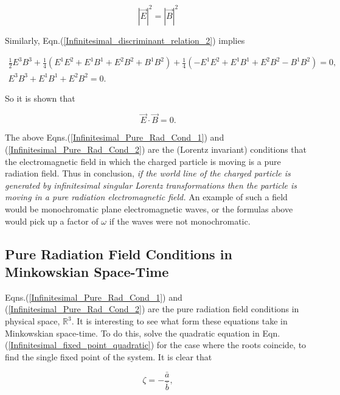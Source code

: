 \begin{equation}\label{Infinitesimal_Pure_Rad_Cond_1}
{|\vec{E}|}^2 = {|\vec{B}|}^2
\end{equation}

\noindent Similarly, Eqn.(\ref{Infinitesimal_discriminant_relation_2}) implies

\begin{gather*}
\frac{1}{2} E^3 B^3 + \frac{1}{4} (E^1E^2 + E^1B^1 + E^2B^2 + B^1B^2) + \frac{1}{4} (-E^1E^2 + E^1B^1 + E^2B^2 - B^1B^2) = 0, \\
E^3B^3 + E^1B^1 + E^2B^2 = 0.
\end{gather*}

\noindent So it is shown that

\begin{equation}\label{Infinitesimal_Pure_Rad_Cond_2}
\vec{E} \cdot \vec{B} = 0.
\end{equation}

\noindent The above Eqns.(\ref{Infinitesimal_Pure_Rad_Cond_1}) and (\ref{Infinitesimal_Pure_Rad_Cond_2}) are the (Lorentz invariant) conditions that the electromagnetic field in which the charged particle is moving is a pure radiation field. Thus in conclusion, \textit{if the world line of the charged particle is generated by infinitesimal singular Lorentz transformations then the particle is moving in a pure radiation electromagnetic field.} An example of such a field would be monochromatic plane electromagnetic waves, or the formulas above would pick up a factor of $\omega$ if the waves were not monochromatic.  

\subsection{Pure Radiation Field Conditions in Minkowskian Space-Time}

Eqns.(\ref{Infinitesimal_Pure_Rad_Cond_1}) and (\ref{Infinitesimal_Pure_Rad_Cond_2}) are the pure radiation field conditions in physical space, ${\mathbb{R}}^3$. It is interesting to see what form these equations take in Minkowskian space-time. To do this, solve the quadratic equation in Eqn.(\ref{Infinitesimal_fixed_point_quadratic}) for the case where the roots coincide, to find the single fixed point of the system. It is clear that 

\begin{equation}\label{Infinitesimal_Zeta_Fixed_Point}
\zeta = - \frac{\bar{a}}{\bar{b}},
\end{equation}

